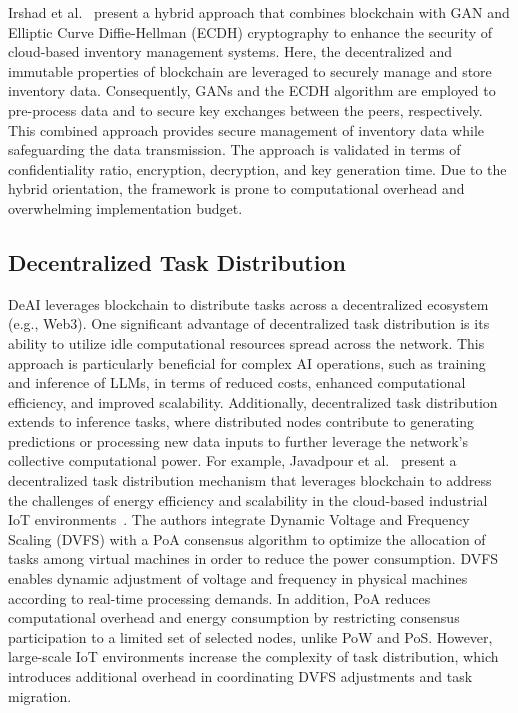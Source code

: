 \documentclass[5p,twocolumn]{elsarticle}
\begin{document}
Irshad et al.~\cite{irshad2024enhancing} present a hybrid approach that combines blockchain with GAN and Elliptic Curve Diffie-Hellman (ECDH) cryptography to enhance the security of cloud-based inventory management systems. Here, the decentralized and immutable properties of blockchain are leveraged to securely manage and store inventory data. Consequently, GANs and the ECDH algorithm are employed to pre-process data and to secure key exchanges between the peers, respectively. This combined approach provides secure management of inventory data while safeguarding the data transmission. The approach is validated in terms of confidentiality ratio, encryption, decryption, and key generation time. Due to the hybrid orientation, the framework is prone to computational overhead and overwhelming implementation budget.


\subsection{Decentralized Task Distribution}
DeAI leverages blockchain to distribute tasks across a decentralized ecosystem (e.g., Web3). One significant advantage of decentralized task distribution is its ability to utilize idle computational resources spread across the network. This approach is particularly beneficial for complex AI operations, such as training and inference of LLMs, in terms of reduced costs, enhanced computational efficiency, and improved scalability. Additionally, decentralized task distribution extends to inference tasks, where distributed nodes contribute to generating predictions or processing new data inputs to further leverage the network's collective computational power. For example, Javadpour et al.~\cite{javadpour2024decentralized} present a decentralized task distribution mechanism that leverages blockchain to address the challenges of energy efficiency and scalability in the cloud-based industrial IoT environments~\cite{al2024digital}. The authors integrate Dynamic Voltage and Frequency Scaling (DVFS) with a PoA consensus algorithm to optimize the allocation of tasks among virtual machines in order to reduce the power consumption. DVFS enables dynamic adjustment of voltage and frequency in physical machines according to real-time processing demands. In addition, PoA reduces computational overhead and energy consumption by restricting consensus participation to a limited set of selected nodes, unlike PoW and PoS. However, large-scale IoT environments increase the complexity of task distribution, which introduces additional overhead in coordinating DVFS adjustments and task migration.
\end{document}
